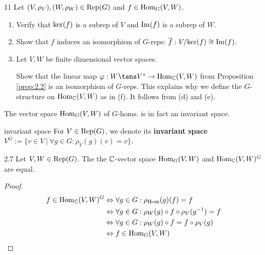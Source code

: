 \documentclass[twoside = false,	%
		headsepline,		%
		parskip = true,
		]{scrbook}						%
\begin{document}
    \begin{exercise}{}{11}
        Let $(V,\rho_V), (W,\rho_W) \in \mathrm{Rep}(G)$ and $f \in \mathrm{Hom}_G(V,W)$.
        \begin{enumerate}
            \item Verify that $\mathrm{ker}(f)$ is a subrep of $V$ and $\mathrm{Im}(f)$ is a subrep of $W$.
            \item Show that $f$ induces an isomorphism of $G$-reps: $\overline{f}: V/\mathrm{ker}(f) \cong \mathrm{Im}(f)$.
            \item Let $V,W$ be finite dimensional vector spaces.
            
            Show that the linear map $\varphi: W \tens V^* \to \Hom_\C(V,W)$ from Proposition \ref{prop:2.2} is an isomorphism of $G$-reps. This explains why we define the $G$-structure on $\mathrm{Hom}_\mathbb C(V,W)$ as in (f). It follows from (d) and (e).  
        \end{enumerate}
    \end{exercise}
%        
    The vector space $\mathrm{Hom}_G(V,W)$ of $G$-homs. is in fact an invariant space.
    \begin{definition*}{invariant space}
        For $V \in \mathrm{Rep}(G)$, we denote its \textbf{invariant space} $V^G := \{v \in V \ | \ \forall g \in G: \rho_V(g)(v) = v \}$.
    \end{definition*}

    \begin{lemma}{}{2.7}
        Let $V,W \in \mathrm{Rep}(G)$. The the $\mathbb C$-vector space $\mathrm{Hom}_G(V,W)$ and $\mathrm{Hom}_\mathbb C(V,W)^G$ are equal.
    \end{lemma}
    \begin{proof}
        \begin{equation*}
        \begin{split}
            f \in \mathrm{Hom}_\mathbb C(V,W)^G &\Leftrightarrow \forall g \in G: \rho_{\mathrm{Hom}}(g)(f) = f \\
            &\Leftrightarrow \forall g \in G: \rho_W(g) \circ f \circ \rho_V(g^{-1}) = f \\
            &\Leftrightarrow \forall g \in G: \rho_W(g) \circ f = f \circ \rho_V(g) \\
            &\Leftrightarrow f \in \mathrm{Hom}_G(V,W)
        \end{split}
        \end{equation*}
    \end{proof}
\end{document}
